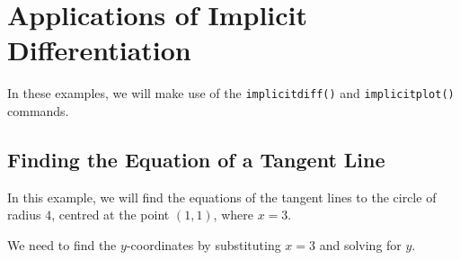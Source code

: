 
\begin{maplegroup}
\begin{mapleinput}
\end{mapleinput}
\mapleresult
\begin{maplelatex}
\end{maplelatex}
\end{maplegroup}

\section{Applications of Implicit Differentiation}

In these examples, we will make use of the \texttt{implicitdiff()} and \texttt{implicitplot()} commands.

\subsection{Finding the Equation of a Tangent Line}
\label{subsec:implicittanline}


In this example, we will find the equations of the tangent lines to the circle of radius $4$, centred at the point $(1,1)$, where $x=3$. 

\begin{maplegroup}
\begin{mapleinput}
\end{mapleinput}
\mapleresult
\begin{maplelatex}
\end{maplelatex}
\end{maplegroup}

We need to find the $y$-coordinates by substituting $x=3$ and solving for $y$.

\begin{maplegroup}
\begin{mapleinput}
\end{mapleinput}
\mapleresult
\begin{maplelatex}
\end{maplelatex}
\mapleresult
\begin{maplelatex}
\end{maplelatex}
\end{maplegroup}

